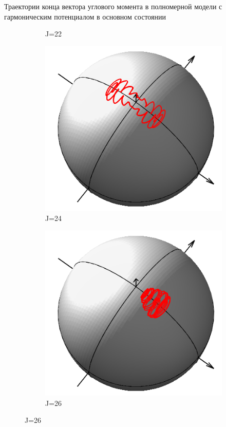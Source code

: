 \documentclass[hyperref={pdfpagelabels=false},usepdftitle=false, xcolor = dvipsnames]{beamer}
\begin{document}
\begin{frame}{\small Траектории конца вектора углового момента в полномерной модели с гармоническим потенциалом в основном состоянии}
\begin{block}{}
\begin{figure}
\begin{subfigure}{0.25\textwidth}
	    \caption{J=22}
	  \end{subfigure}
	  \begin{subfigure}{0.25\textwidth}
	    \includegraphics[width = \linewidth]{../pictures/HarmGroundState00/plot_J=24.png}
	    \caption{J=24}
	  \end{subfigure}
	  \begin{subfigure}{0.25\textwidth}
	    \includegraphics[width = \linewidth]{../pictures/HarmGroundState00/plot_J=26.png}
	    \caption{J=26}
	  \end{subfigure}
	\end{figure}
  \end{block}
\end{frame}
\end{document}

